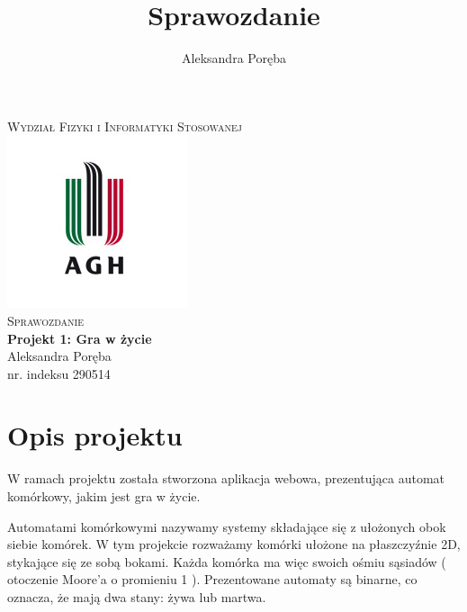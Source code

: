 \documentclass[12pt]{article}
\title{Sprawozdanie}
\author{Aleksandra Poręba}
\makeatletter
\let\thetitle\@title
\let\theauthor\@author
\makeatother
\begin{document}
\begin{center}
\textsc{\normalsize Wydział Fizyki i Informatyki Stosowanej}\\[2.0cm] 
\includegraphics[scale = 1]{logo.png}\\[1cm] 


\textsc{\Large Sprawozdanie}\\[0.4cm]
{ \huge \bfseries \LARGE{Projekt 1: Gra w życie} }\\[1cm] 

\flushright \Large Aleksandra Poręba \\ nr. indeksu 290514

\vfill 

\center{\today}


\pagebreak 

\end{center}



\pagestyle{fancy}
\fancyhf{}

\rhead{\theauthor}
\lhead{\thetitle}
\cfoot{\thepage}

\section{Opis projektu}
W ramach projektu została stworzona aplikacja webowa, prezentująca automat komórkowy, jakim jest gra w życie.

Automatami komórkowymi nazywamy systemy składające się z ułożonych obok siebie komórek. W tym projekcie rozważamy komórki ułożone na płaszczyźnie 2D, stykające się ze sobą bokami. Każda komórka ma więc swoich ośmiu sąsiadów ( otoczenie Moore'a o promieniu 1 ). Prezentowane automaty są binarne, co oznacza, że mają dwa stany: żywa lub martwa.
\end{document}
